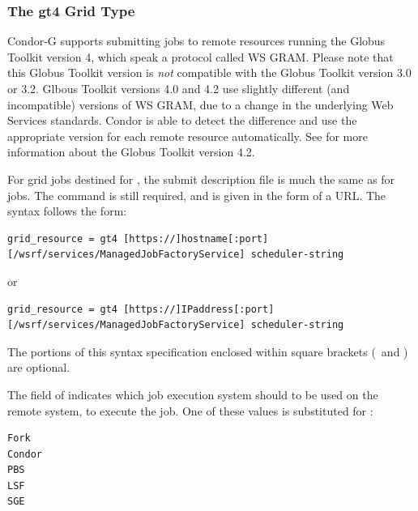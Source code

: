 \subsubsection{\label{sec:Using-gt4}The gt4 Grid Type}

Condor-G supports submitting jobs to remote resources running
the Globus Toolkit version 4, which speak a protocol called
WS GRAM.
Please note that this Globus Toolkit version
is \emph{not} compatible with the Globus Toolkit version 3.0 or 3.2.
Glbous Toolkit versions 4.0 and 4.2 use slightly different (and
incompatible) versions of WS GRAM, due to a change in the underlying
Web Services standards. Condor is able to detect the difference and
use the appropriate version for each remote resource automatically.
See
for more information about the Globus Toolkit version 4.2.

For grid jobs destined for ,
the submit description file is much the same as for
 jobs.
The  command is still required,
and is given in the form of a URL. 
The syntax follows the form:
\footnotesize
\begin{verbatim}
grid_resource = gt4 [https://]hostname[:port][/wsrf/services/ManagedJobFactoryService] scheduler-string
\end{verbatim}
\normalsize

or
\footnotesize
\begin{verbatim}
grid_resource = gt4 [https://]IPaddress[:port][/wsrf/services/ManagedJobFactoryService] scheduler-string
\end{verbatim}
\normalsize
The portions of this syntax specification enclosed within
square brackets (\Lbr\ and \Rbr) are optional.

The  field of 
indicates which job execution
system should to be used on the remote system, to execute the job. One of
these values is substituted for :
\begin{verbatim}
Fork
Condor
PBS
LSF
SGE
\end{verbatim}


